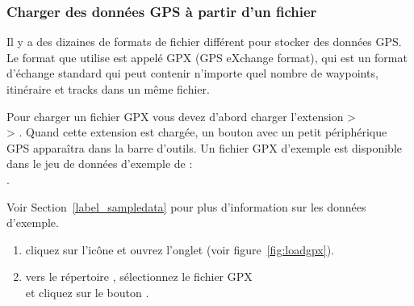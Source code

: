 \subsubsection{Charger des données GPS à partir d'un fichier}\label{label_loadgps}

Il y a des dizaines de formats de fichier différent pour stocker des données
GPS.
Le format que \qg utilise est appelé GPX (GPS eXchange format), qui est un format d'échange standard qui peut contenir n'importe quel nombre de waypoints, itinéraire et tracks dans un même fichier.

Pour charger un fichier GPX vous devez d'abord charger l'extension  >\\  > . Quand cette extension est chargée, un bouton avec un petit périphérique GPS apparaîtra dans la barre d'outils. Un fichier GPX d'exemple est disponible dans le jeu de données d'exemple de \qg :\\
. 
\par
Voir Section~\ref{label_sampledata} pour plus d'information sur les données d'exemple.

\begin{enumerate}
\item cliquez sur l'icône  et ouvrez l'onglet  (voir figure~\ref{fig:loadgpx}).
\item {} vers le répertoire , sélectionnez le fichier GPX\\  et cliquez sur le bouton .
\end{enumerate}

